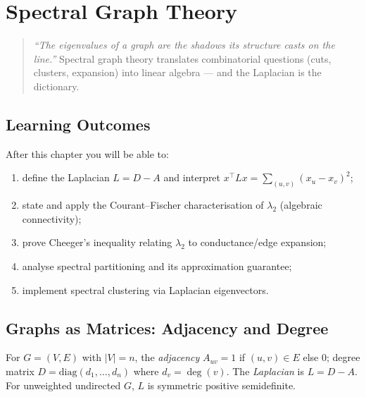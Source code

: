 \chapter{Spectral Graph Theory}
\label{ch:spectral}

\begin{quote}
\emph{``The eigenvalues of a graph are the shadows its structure casts on the line.''}
Spectral graph theory translates combinatorial questions (cuts, clusters, expansion) into linear algebra --- and the Laplacian is the dictionary.
\end{quote}

\noindent{}
\vspace{0.4em}

\section*{Learning Outcomes}
After this chapter you will be able to:
\begin{enumerate}[label=(L\arabic*)]
    \item define the Laplacian $L=D-A$ and interpret $x^{\top}Lx=\sum_{(u,v)}(x_u-x_v)^2$;
    \item state and apply the Courant--Fischer characterisation of $\lambda_2$ (algebraic connectivity);
    \item prove Cheeger's inequality relating $\lambda_2$ to conductance/edge expansion;
    \item analyse spectral partitioning and its approximation guarantee;
    \item implement spectral clustering via Laplacian eigenvectors.
\end{enumerate}

\section{Graphs as Matrices: Adjacency and Degree}
\label{sec:matrices}

For $G=(V,E)$ with $|V|=n$, the \emph{adjacency} $A_{uv}=1$ if $(u,v)\in E$ else $0$; degree matrix $D=\text{diag}(d_1,\dots,d_n)$ where $d_v=\deg(v)$. The \emph{Laplacian} is $L=D-A$. For unweighted undirected $G$, $L$ is symmetric positive semidefinite.

